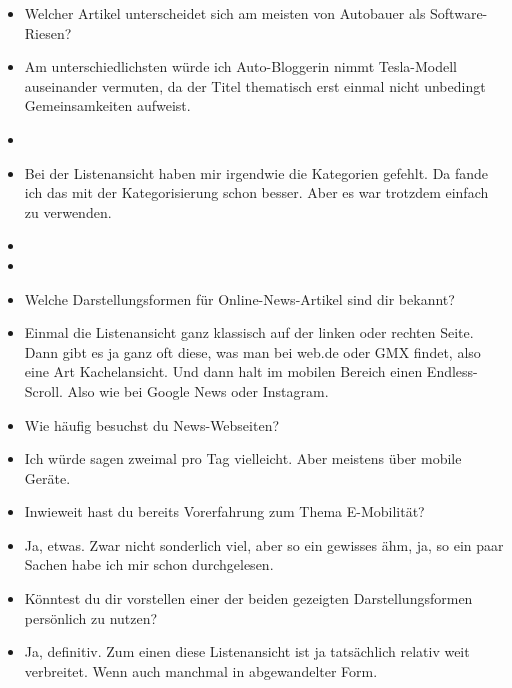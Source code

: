 {\begin{itemize}[]
                  Hier würde ich den Artikel \flqq Herstellungskosten gecheckt\frqq{} nehmen, da er auch die Sicht der Autobauer beleuchtet.
            \item {} Welcher Artikel unterscheidet sich am meisten von \flqq Autobauer als Software-Riesen\frqq{}?
            \item {} Am unterschiedlichsten würde ich \flqq Auto-Bloggerin nimmt Tesla-Modell auseinander\frqq{} vermuten, da der Titel thematisch erst einmal nicht unbedingt Gemeinsamkeiten aufweist.
            \item {}
            \item {} Bei der Listenansicht haben mir irgendwie die Kategorien gefehlt.
                  Da fande ich das mit der Kategorisierung schon besser.
                  Aber es war trotzdem einfach zu verwenden.
            \item {}
            \item {}
            \item {} Welche Darstellungsformen für Online-News-Artikel sind dir bekannt?
            \item {} Einmal die Listenansicht ganz klassisch auf der linken oder rechten Seite.
                  Dann gibt es ja ganz oft diese, was man bei web.de oder GMX findet, also eine Art Kachelansicht.
                  Und dann halt im mobilen Bereich einen Endless-Scroll.
                  Also wie bei Google News oder Instagram.
            \item {} Wie häufig besuchst du News-Webseiten?
            \item {} Ich würde sagen zweimal pro Tag vielleicht. Aber meistens über mobile Geräte.
            \item {} Inwieweit hast du bereits Vorerfahrung zum Thema E-Mobilität?
            \item {} Ja, etwas. Zwar nicht sonderlich viel, aber so ein gewisses ähm, ja, so ein paar Sachen habe ich mir schon durchgelesen.
            \item {} Könntest du dir vorstellen einer der beiden gezeigten Darstellungsformen persönlich zu nutzen?
            \item {} Ja, definitiv. Zum einen diese Listenansicht ist ja tatsächlich relativ weit verbreitet.
                  Wenn auch manchmal in abgewandelter Form.

\end{itemize}}
